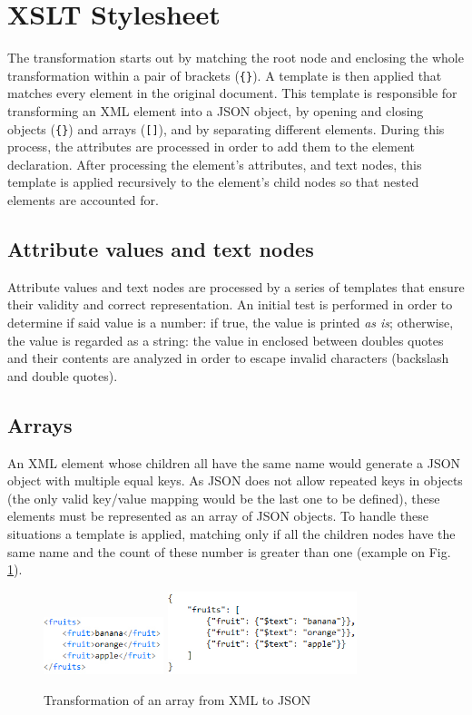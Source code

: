 \documentclass[twocolumn,twoside,10pt,a4paper]{article}
\begin{document}
\section{XSLT Stylesheet}\label{sec:xslt-stylesheet}

The transformation starts out by matching the root node and enclosing the whole transformation within a pair of brackets (\verb!{}!). A template is then applied that matches every element in the original document. This template is responsible for transforming an XML element into a JSON object, by opening and closing objects (\verb!{}!) and arrays (\verb![]!), and by separating different elements. During this process, the attributes are processed in order to add them to the element declaration. After processing the element's attributes, and text nodes, this template is applied recursively to the element's child nodes so that nested elements are accounted for.

\subsection{Attribute values and text nodes}

Attribute values and text nodes are processed by a series of templates that ensure their validity and correct representation\cite{json_format}. An initial test is performed in order to determine if said value is a number: if true, the value is printed \textit{as is}; otherwise, the value is regarded as a string: the value in enclosed between doubles quotes and their contents are analyzed in order to escape invalid characters (backslash and double quotes).

\subsection{Arrays}
An XML element whose children all have the same name would generate a JSON object with multiple equal keys. As JSON does not allow repeated keys in objects (the only valid key/value mapping would be the last one to be defined), these elements must be represented as an array of JSON objects. To handle these situations a template is applied, matching only if all the children nodes have the same name and the count of these number is greater than one (example on Fig. \ref{fig:array_xml2json}).

\begin{figure}[h]
\centering
\includegraphics[width=35mm]{images/array_xml.jpg}
\includegraphics[width=55mm]{images/array_json.jpg}
\caption{Transformation of an array from XML to JSON}
\label{fig:array_xml2json}
\end{figure}
\end{document}
